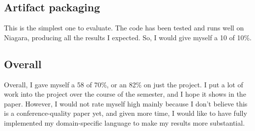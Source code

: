 \documentclass[sigconf,authordraft]{acmart}
\begin{document}
\subsection{Artifact packaging}
This is the simplest one to evaluate. The code has been tested and runs well on Niagara, producing all the results I expected. So, I would give myself a 10 of 10\%.

\subsection{Overall}

Overall, I gave myself a 58 of 70\%, or an 82\% on just the project. I put a lot of work into the project over the course of the semester, and I hope it shows in the paper. However, I would not rate myself high mainly because I don't believe this is a conference-quality paper yet, and given more time, I would like to have fully implemented my domain-specific language to make my results more substantial.
\end{document}
